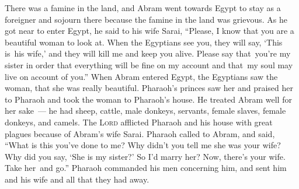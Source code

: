 \begin{inparaenum}
   There was a famine in the land, and Abram went towards Egypt to stay as a foreigner and sojourn there because the famine in the land was grievous.%
   As he got near to enter Egypt, he said to his wife Sarai, ``Please, I know that you are a beautiful woman to look at.%
   When the Egyptians see you, they will say, `This is\understood\ his wife,' and they will kill me and keep you alive.%
   Please say that\understood\ you're my sister in order that everything will be fine on my account and that\understood\ my soul may live on account of you.''%
   When Abram entered Egypt, the Egyptians saw the woman, that she was really beautiful.%
   Pharaoh's princes saw her and praised her to Pharaoh and took the woman to Pharaoh's house.%
   He treated Abram well for her sake~--- he had sheep, cattle, male donkeys, servants, female slaves, female donkeys, and camels.%
   The \textsc{Lord} afflicted Pharaoh and his house with great plagues because of Abram's wife Sarai.%
   Pharaoh called to Abram, and said, ``What is this you've done to me? Why didn't you tell me she was your wife?%
   Why did you say, `She is my sister?' So I'd marry her? Now, there's your wife. Take her\understood\ and go.''%
   Pharaoh commanded his men concerning him, and sent him and his wife and all that they had away.%
\end{inparaenum}
